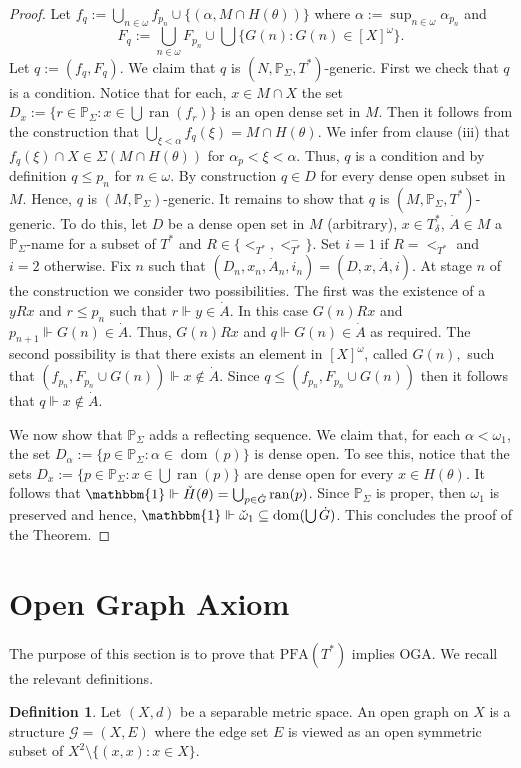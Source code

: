 \documentclass{amsart}
\theoremstyle{definition}
\newtheorem{definition}[theorem]{Definition}
\newcommand{\al}{\omega_1}
\renewcommand{\P}{\mathbb{P}}
\newcommand{\PFA}{\mathrm{PFA}}
\newcommand{\OGA}{\mathrm{OGA}}
\DeclareMathOperator{\dom}{dom}
\DeclareMathOperator{\ran}{ran}
\begin{document}
\begin{proof}
  Let $f_q:=\bigcup_{n\in \omega}f_{p_n}\cup \{(\alpha,M\cap H(\theta))\}$ where $\alpha:=\sup_{n\in\omega}\alpha_{p_n}$ and $$F_q:=\bigcup_{n\in\omega} F_{p_n}\cup \bigcup\{G(n) : G(n)\in [X]^\omega\}.$$ Let $q:=(f_q,F_q)$. We claim that $q$ is $(N,\P_\Sigma,T^*)$-generic.
First we check that $q$ is a condition. Notice that for each, $x\in M\cap X$  the set $D_x:=\{r\in \P_\Sigma: x\in \bigcup\ran( f_r)\}$ is an open dense set in $M$. Then it follows from the construction that $\bigcup_{\xi<\alpha}f_q(\xi)=M\cap H(\theta). $ We infer from clause (iii)  that $f_q(\xi)\cap X\in \Sigma(M\cap H(\theta))$ for $\alpha_{p}<\xi<\alpha$. Thus, $q$ is a  condition and by definition $q\leq p_n$ for $n\in\omega.$ By construction  $q\in D$ for every dense open subset in $M$. Hence, $q$ is $(M,\P_\Sigma)$-generic.
It remains to show that $q$ is $(M,\P_\Sigma,T^*)$-generic. To do this, let $D$ be a dense open set in $M$ (arbitrary), $x\in T^*_\delta$, $\dot A\in M$ a $\P_\Sigma$-name for a subset of $T^*$ and $R\in\{<_{T^*},<_{T^*}^-\}$. Set $i=1$ if $R=<_{T^*}$ and $i=2$ otherwise. Fix $n$ such that $(D_n,x_n,\dot A_n,i_n)=(D,x,\dot A,i)$. At stage $n$ of the construction we consider two possibilities. The first was the existence of  a $yRx$ and $r\leq p_n$ such that $r\Vdash y\in \dot A$. In this case $G(n)Rx$ and $p_{n+1}\Vdash G(n)\in \dot A$. Thus, $G(n)Rx$ and $q\Vdash G(n)\in \dot A$ as required. The second possibility is that there exists an element in $[X]^\omega$, called $G(n),$ such that $(f_{p_n},F_{p_n}\cup G(n))\Vdash x\notin \dot A $. Since $q\leq (f_{p_n},F_{p_n}\cup G(n))$ then it follows that $q\Vdash x\notin \dot A$.

We now show that $\P_\Sigma$ adds a reflecting sequence. We claim that, for each $\alpha<\al$, the set $D_\alpha:=\{p\in\P_\Sigma: \alpha\in \dom(p)\}$ is dense open.  To see this, notice that the sets $D_x:=\{p\in \P_\Sigma: x\in\bigcup \ran(p)\}$ are dense open for every $x\in H(\theta)$. It follows that $\mathbbm{1}\Vdash \check H(\theta)=\bigcup_{p\in \dot G}\ran(p)$. Since $\P_\Sigma$ is proper, then $\omega_1$ is preserved and hence,  $\mathbbm{1}\Vdash \check \al\subseteq \dom(\bigcup \dot G) $. This concludes the proof of the Theorem.
\end{proof}

\section{Open Graph Axiom}\label{sec:oga}
 The purpose of this section is to prove that $\PFA(T^*)$ implies  $\OGA$. We recall the relevant definitions.
\begin{definition}
    Let $(X,d)$ be a separable metric space. An open graph on $X$ is a structure $\mathcal{G} = (X, E)$ where the edge set $E$ is viewed as an open symmetric subset of $X^2 \setminus \{(x, x) : x \in X\}$.
\end{definition}
\end{document}
